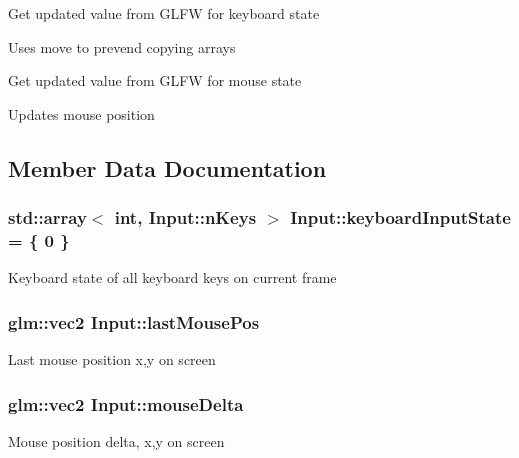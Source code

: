 Get updated value from G\+L\+F\+W for keyboard state

Uses move to prevend copying arrays

Get updated value from G\+L\+F\+W for mouse state

Updates mouse position 

\subsection{Member Data Documentation}
\hypertarget{class_input_a97eec171d280642b3a52c296503c2664}{}
\subsubsection[{keyboard\+Input\+State}]{\setlength{\rightskip}{0pt plus 5cm}std\+::array$<$ int, Input\+::n\+Keys $>$ Input\+::keyboard\+Input\+State = \{ 0 \}\hspace{0.3cm}{\ttfamily [static]}}\label{class_input_a97eec171d280642b3a52c296503c2664}
Keyboard state of all keyboard keys on current frame \hypertarget{class_input_a43c2217c224a48ff3af89ee9e284df69}{}
\subsubsection[{last\+Mouse\+Pos}]{\setlength{\rightskip}{0pt plus 5cm}glm\+::vec2 Input\+::last\+Mouse\+Pos\hspace{0.3cm}{\ttfamily [static]}}\label{class_input_a43c2217c224a48ff3af89ee9e284df69}
Last mouse position x,y on screen \hypertarget{class_input_ab86bb9716a4ac0ca353eade82c20cf7f}{}
\subsubsection[{mouse\+Delta}]{\setlength{\rightskip}{0pt plus 5cm}glm\+::vec2 Input\+::mouse\+Delta\hspace{0.3cm}{\ttfamily [static]}}\label{class_input_ab86bb9716a4ac0ca353eade82c20cf7f}
Mouse position delta, x,y on screen \hypertarget{class_input_afd2b6ea6a62a21bb5af4d5d7688b9509}{}
